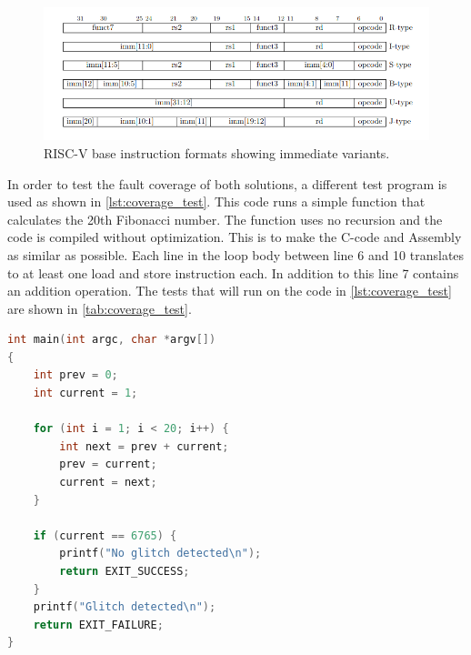 \begin{figure}[h!]
    \centering
    \includegraphics[width=\textwidth]{docs/images/riscv_instructions.png}
    \caption{RISC-V base instruction formats showing immediate variants\cite{riscv_manual}.}
    \label{fig:riscv_instructions}
\end{figure}

In order to test the fault coverage of both solutions, a different test program is used as shown in \autoref{lst:coverage_test}. This code runs a simple function that calculates the 20th Fibonacci number. The function uses no recursion and the code is compiled without optimization. This is to make the C-code and Assembly as similar as possible. Each line in the loop body between line 6 and 10 translates to at least one load and store instruction each. In addition to this line 7 contains an addition operation. The tests that will run on the code in \autoref{lst:coverage_test} are shown in \autoref{tab:coverage_test}.

\begin{lstlisting}[caption={A sample C++ code}, label=lst:coverage_test, language=C++]
int main(int argc, char *argv[])
{
    int prev = 0;
    int current = 1;

    for (int i = 1; i < 20; i++) {
        int next = prev + current;
        prev = current;
        current = next;
    }

    if (current == 6765) {
        printf("No glitch detected\n");
        return EXIT_SUCCESS;
    }
    printf("Glitch detected\n");
    return EXIT_FAILURE;
}
\end{lstlisting}

